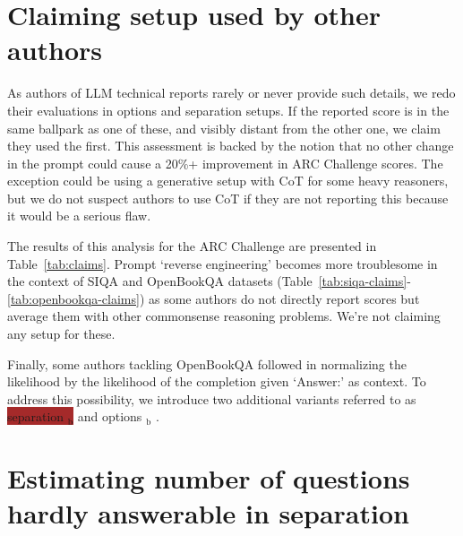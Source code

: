 \documentclass[11pt]{article}
\DeclareRobustCommand{\shl}[3]{
  \begingroup\setlength{\fboxsep}{2pt}%
  \colorbox{#1}{{\hspace*{2pt}\vphantom{Ay}#2\hspace*{2pt}}}%
  \endgroup
}
\begin{document}
\section{Claiming setup used by other authors}\label{appendix:claims}
As authors of LLM technical reports rarely or never provide such details, we redo their evaluations in \shl{all}{options}{} and \shl{separation}{separation}{} setups. If the reported score is in the same ballpark as one of these, and visibly distant from the other one, we claim they used the first.
This assessment is backed by the notion that no other change in the prompt could cause a 20\%+ improvement in ARC Challenge scores. The exception could be using a generative setup with CoT for some heavy reasoners, but we do not suspect authors to use CoT if they are not reporting this because it would be a serious flaw.

The results of this analysis for the ARC Challenge are presented in Table~\ref{tab:claims}. Prompt `reverse engineering' becomes more troublesome in the context of SIQA and OpenBookQA datasets (Table~\ref{tab:siqa-claims}-\ref{tab:openbookqa-claims}) as some authors do not directly report scores but average them with other commonsense reasoning problems. We're not claiming any setup for these.

Finally, some authors tackling OpenBookQA followed \citet{DBLP:journals/corr/abs-2005-14165} in normalizing the likelihood by the likelihood of the completion given `Answer:' as context. To address this possibility, we introduce two additional variants referred to as \shl{brown}{separation $_\mathrm{b}$}{} and \shl{brown2}{options $_\mathrm{b}$}{}.

\section{Estimating number of questions hardly answerable in separation}
\label{appendix:hardly}
\end{document}
